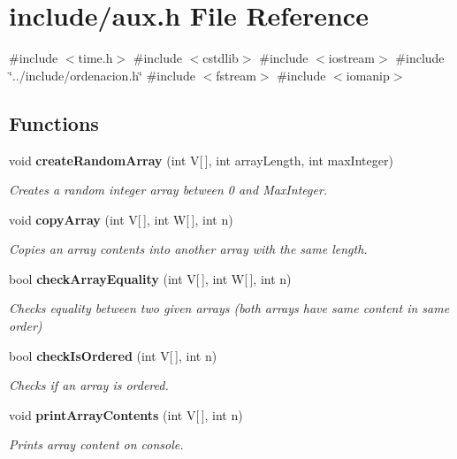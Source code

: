 \section{include/aux.h \-File \-Reference}
\label{aux_8h}
{\ttfamily \#include $<$time.\-h$>$}\*
{\ttfamily \#include $<$cstdlib$>$}\*
{\ttfamily \#include $<$iostream$>$}\*
{\ttfamily \#include \char`\"{}../include/ordenacion.\-h\char`\"{}}\*
{\ttfamily \#include $<$fstream$>$}\*
{\ttfamily \#include $<$iomanip$>$}\*
\subsection*{\-Functions}
\begin{DoxyCompactItemize}
\item 
void {\bf create\-Random\-Array} (int \-V[$\,$], int array\-Length, int max\-Integer)
\begin{DoxyCompactList}\small\item\em \-Creates a random integer array between 0 and \-Max\-Integer. \end{DoxyCompactList}\item 
void {\bf copy\-Array} (int \-V[$\,$], int \-W[$\,$], int n)
\begin{DoxyCompactList}\small\item\em \-Copies an array contents into another array with the same length. \end{DoxyCompactList}\item 
bool {\bf check\-Array\-Equality} (int \-V[$\,$], int \-W[$\,$], int n)
\begin{DoxyCompactList}\small\item\em \-Checks equality between two given arrays (both arrays have same content in same order) \end{DoxyCompactList}\item 
bool {\bf check\-Is\-Ordered} (int \-V[$\,$], int n)
\begin{DoxyCompactList}\small\item\em \-Checks if an array is ordered. \end{DoxyCompactList}\item 
void {\bf print\-Array\-Contents} (int \-V[$\,$], int n)
\begin{DoxyCompactList}\small\item\em \-Prints array content on console. \end{DoxyCompactList}\end{DoxyCompactItemize}


